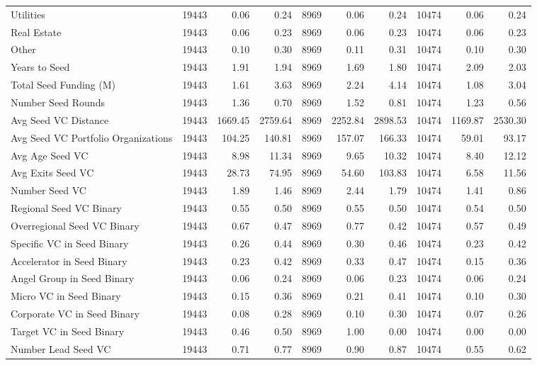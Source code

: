 {\begin{table}[!h]
{\begin{tabular}[t]{lrrrrrrrrr}
Utilities & 19443 & 0.06 & 0.24 & 8969 & 0.06 & 0.24 & 10474 & 0.06 & 0.24\\
Real Estate & 19443 & 0.06 & 0.23 & 8969 & 0.06 & 0.23 & 10474 & 0.06 & 0.23\\
Other & 19443 & 0.10 & 0.30 & 8969 & 0.11 & 0.31 & 10474 & 0.10 & 0.30\\
Years to Seed & 19443 & 1.91 & 1.94 & 8969 & 1.69 & 1.80 & 10474 & 2.09 & 2.03\\
\addlinespace
Total Seed Funding (M) & 19443 & 1.61 & 3.63 & 8969 & 2.24 & 4.14 & 10474 & 1.08 & 3.04\\
Number Seed Rounds & 19443 & 1.36 & 0.70 & 8969 & 1.52 & 0.81 & 10474 & 1.23 & 0.56\\
Avg Seed VC Distance & 19443 & 1669.45 & 2759.64 & 8969 & 2252.84 & 2898.53 & 10474 & 1169.87 & 2530.30\\
Avg Seed VC Portfolio Organizations & 19443 & 104.25 & 140.81 & 8969 & 157.07 & 166.33 & 10474 & 59.01 & 93.17\\
Avg Age Seed VC & 19443 & 8.98 & 11.34 & 8969 & 9.65 & 10.32 & 10474 & 8.40 & 12.12\\
\addlinespace
Avg Exits Seed VC & 19443 & 28.73 & 74.95 & 8969 & 54.60 & 103.83 & 10474 & 6.58 & 11.56\\
Number Seed VC & 19443 & 1.89 & 1.46 & 8969 & 2.44 & 1.79 & 10474 & 1.41 & 0.86\\
Regional Seed VC Binary & 19443 & 0.55 & 0.50 & 8969 & 0.55 & 0.50 & 10474 & 0.54 & 0.50\\
Overregional Seed VC Binary & 19443 & 0.67 & 0.47 & 8969 & 0.77 & 0.42 & 10474 & 0.57 & 0.49\\
Specific VC in Seed Binary & 19443 & 0.26 & 0.44 & 8969 & 0.30 & 0.46 & 10474 & 0.23 & 0.42\\
\addlinespace
Accelerator in Seed Binary & 19443 & 0.23 & 0.42 & 8969 & 0.33 & 0.47 & 10474 & 0.15 & 0.36\\
Angel Group in Seed Binary & 19443 & 0.06 & 0.24 & 8969 & 0.06 & 0.23 & 10474 & 0.06 & 0.24\\
Micro VC in Seed Binary & 19443 & 0.15 & 0.36 & 8969 & 0.21 & 0.41 & 10474 & 0.10 & 0.30\\
Corporate VC in Seed Binary & 19443 & 0.08 & 0.28 & 8969 & 0.10 & 0.30 & 10474 & 0.07 & 0.26\\
Target VC in Seed Binary & 19443 & 0.46 & 0.50 & 8969 & 1.00 & 0.00 & 10474 & 0.00 & 0.00\\
\addlinespace
Number Lead Seed VC & 19443 & 0.71 & 0.77 & 8969 & 0.90 & 0.87 & 10474 & 0.55 & 0.62\\

\end{tabular}}
\end{table}}
